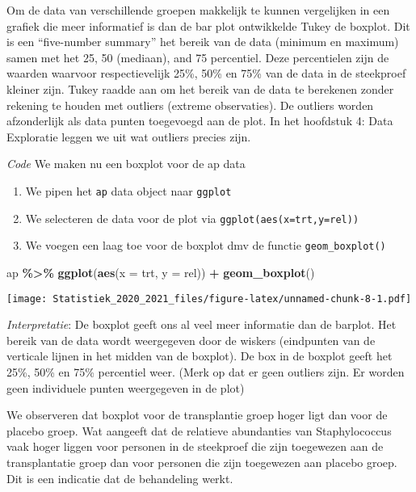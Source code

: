 \documentclass[
  12pt,dutch,coursenotes]{book}
\newenvironment{Shaded}{\begin{snugshade}}{\end{snugshade}}
\newcommand{\DataTypeTok}[1]{\textcolor[rgb]{0.13,0.29,0.53}{#1}}
\newcommand{\KeywordTok}[1]{\textcolor[rgb]{0.13,0.29,0.53}{\textbf{#1}}}
\newcommand{\NormalTok}[1]{#1}
\newcommand{\OperatorTok}[1]{\textcolor[rgb]{0.81,0.36,0.00}{\textbf{#1}}}
\newcommand{\StringTok}[1]{\textcolor[rgb]{0.31,0.60,0.02}{#1}}
\providecommand{\tightlist}{%
  \setlength{\itemsep}{0pt}\setlength{\parskip}{0pt}}
\theoremstyle{definition}
\theoremstyle{definition}
\theoremstyle{definition}
\theoremstyle{remark}
\begin{document}
Om de data van verschillende groepen makkelijk te kunnen vergelijken in een grafiek die meer informatief is dan de bar plot ontwikkelde Tukey de boxplot. Dit is een ``five-number summary'' het bereik van de data (minimum en maximum) samen met het 25, 50 (mediaan), and 75 percentiel. Deze percentielen zijn de waarden waarvoor respectievelijk 25\%, 50\% en 75\% van de data in de steekproef kleiner zijn. Tukey raadde aan om het bereik van de data te berekenen zonder rekening te houden met outliers (extreme observaties). De outliers worden afzonderlijk als data punten toegevoegd aan de plot. In het hoofdstuk 4: Data Exploratie leggen we uit wat outliers precies zijn.

\emph{Code}
We maken nu een boxplot voor de ap data

\begin{enumerate}
\def\labelenumi{\arabic{enumi}.}
\tightlist
\item
  We pipen het \texttt{ap} data object naar \texttt{ggplot}
\item
  We selecteren de data voor de plot via \texttt{ggplot(aes(x=trt,y=rel))}
\item
  We voegen een laag toe voor de boxplot dmv de functie \texttt{geom\_boxplot()}
\end{enumerate}

\begin{Shaded}
\begin{Highlighting}[]
\NormalTok{ap }\OperatorTok{\%\textgreater{}\%}\StringTok{ }\KeywordTok{ggplot}\NormalTok{(}\KeywordTok{aes}\NormalTok{(}\DataTypeTok{x =}\NormalTok{ trt, }\DataTypeTok{y =}\NormalTok{ rel)) }\OperatorTok{+}\StringTok{ }\KeywordTok{geom\_boxplot}\NormalTok{()}
\end{Highlighting}
\end{Shaded}

\texttt{[image: Statistiek\_2020\_2021\_files/figure-latex/unnamed-chunk-8-1.pdf]}

\emph{Interpretatie}: De boxplot geeft ons al veel meer informatie dan de barplot. Het bereik van de data wordt weergegeven door de wiskers (eindpunten van de verticale lijnen in het midden van de boxplot). De box in de boxplot geeft het 25\%, 50\% en 75\% percentiel weer. (Merk op dat er geen outliers zijn. Er worden geen individuele punten weergegeven in de plot)

We observeren dat boxplot voor de transplantie groep hoger ligt dan voor de placebo groep. Wat aangeeft dat de relatieve abundanties van Staphylococcus vaak hoger liggen voor personen in de steekproef die zijn toegewezen aan de transplantatie groep dan voor personen die zijn toegewezen aan placebo groep. Dit is een indicatie dat de behandeling werkt.
\end{document}
